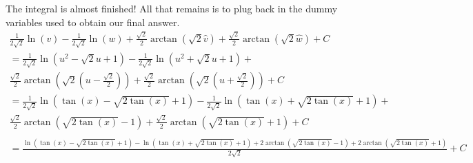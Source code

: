 \documentclass{article}
\theoremstyle{definition}
\begin{document}
The integral is almost finished! All that remains is to plug back in the dummy variables used to 
obtain our final answer.
\begin{equation*}
\begin{gathered}
    \frac{1}{2\sqrt{2}}\ln(v) - \frac{1}{2\sqrt{2}}\ln(w) + 
    \frac{\sqrt{2}}{2}\arctan(\sqrt{2}\hat{v}) + \frac{\sqrt{2}}{2}\arctan(\sqrt{2}\hat{w}) + C\\
    =\frac{1}{2\sqrt{2}}\ln(u^2-\sqrt{2}u+1) - \frac{1}{2\sqrt{2}}\ln(u^2+\sqrt{2}u+1) + \\
    \frac{\sqrt{2}}{2}\arctan\left(\sqrt{2}\left(u-\frac{\sqrt{2}}{2}\right)\right) + %
    \frac{\sqrt{2}}{2}\arctan\left(\sqrt{2}\left(u+\frac{\sqrt{2}}{2}\right)\right) + C\\
    =\frac{1}{2\sqrt{2}}\ln\left(\tan(x)-\sqrt{2\tan(x)}+1\right) - %
    \frac{1}{2\sqrt{2}}\ln\left(\tan(x)+\sqrt{2\tan(x)}+1\right) + \\
    \frac{\sqrt{2}}{2}\arctan\left(\sqrt{2\tan(x)}-1\right) + %
    \frac{\sqrt{2}}{2}\arctan\left(\sqrt{2\tan(x)}+1\right) + C\\
\end{gathered}
\end{equation*}
\tiny
\begin{equation*}
\begin{gathered}
    =\boxed{\frac{\ln\left(\tan(x)-\sqrt{2\tan(x)}+1\right) - \ln\left(\tan(x)+\sqrt{2\tan(x)}+1\right) %
    + 2\arctan\left(\sqrt{2\tan(x)}-1\right) + 2\arctan\left(\sqrt{2\tan(x)}+1\right)}{2\sqrt{2}} + C}
\end{gathered}
\end{equation*}
\normalsize
\end{document}

